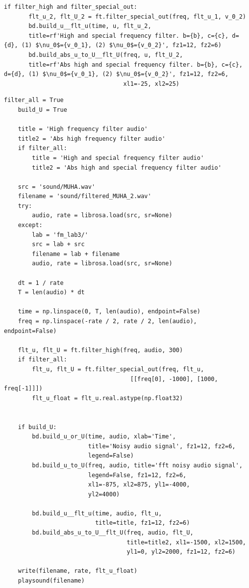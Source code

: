 \documentclass[a4paper, 12pt]{article}
\begin{document}
\begin{lstlisting}[label=l7, caption={Файл nospec.py. Фильтрация специфических частот.}]
    if filter_high and filter_special_out:
       flt_u_2, flt_U_2 = ft.filter_special_out(freq, flt_u_1, v_0_2)
       bd.build_u__flt_u(time, u, flt_u_2,
       title=rf'High and special frequency filter. b={b}, c={c}, d={d}, (1) $\nu_0$={v_0_1}, (2) $\nu_0$={v_0_2}', fz1=12, fz2=6)
       bd.build_abs_u_to_U__flt_U(freq, u, flt_U_2,
       title=rf'Abs high and special frequency filter. b={b}, c={c}, d={d}, (1) $\nu_0$={v_0_1}, (2) $\nu_0$={v_0_2}', fz1=12, fz2=6,
                                  xl1=-25, xl2=25)
    \end{lstlisting}
    \begin{lstlisting}[label=l8, caption={Файл audio.py. Фильтрация шумов в аудиозаписи.}]
    filter_all = True
    build_U = True
        
    title = 'High frequency filter audio'
    title2 = 'Abs high frequency filter audio'
    if filter_all:
        title = 'High and special frequency filter audio'
        title2 = 'Abs high and special frequency filter audio'
        
    src = 'sound/MUHA.wav'
    filename = 'sound/filtered_MUHA_2.wav'
    try:
        audio, rate = librosa.load(src, sr=None)
    except:
        lab = 'fm_lab3/'
        src = lab + src
        filename = lab + filename
        audio, rate = librosa.load(src, sr=None)
        
    dt = 1 / rate
    T = len(audio) * dt
        
    time = np.linspace(0, T, len(audio), endpoint=False)
    freq = np.linspace(-rate / 2, rate / 2, len(audio), endpoint=False)
        
    flt_u, flt_U = ft.filter_high(freq, audio, 300)
    if filter_all:
        flt_u, flt_U = ft.filter_special_out(freq, flt_u,
                                    [[freq[0], -1000], [1000, freq[-1]]])
        flt_u_float = flt_u.real.astype(np.float32)
        
        
    if build_U:
        bd.build_u_or_U(time, audio, xlab='Time',
                        title='Noisy audio signal', fz1=12, fz2=6,
                        legend=False)
        bd.build_u_to_U(freq, audio, title='fft noisy audio signal',
                        legend=False, fz1=12, fz2=6,
                        xl1=-875, xl2=875, yl1=-4000,
                        yl2=4000)
        
        bd.build_u__flt_u(time, audio, flt_u,
                          title=title, fz1=12, fz2=6)
        bd.build_abs_u_to_U__flt_U(freq, audio, flt_U,
                                   title=title2, xl1=-1500, xl2=1500,
                                   yl1=0, yl2=2000, fz1=12, fz2=6)
        
    write(filename, rate, flt_u_float)
    playsound(filename)
    \end{lstlisting}
\end{document}

